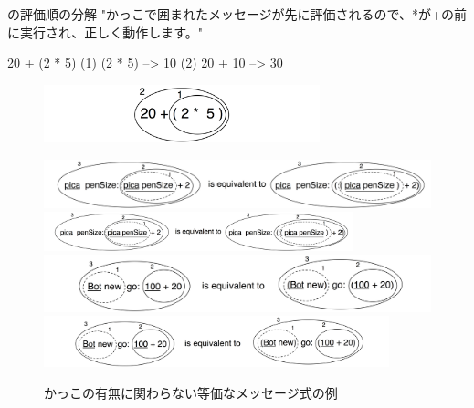 \documentclass[a4paper,10pt,twoside]{book}
\begin{document}
\begin{example}[mathcorrect]{の評価順の分解}{}
"かっこで囲まれたメッセージが先に評価されるので、*が+の前に実行され、正しく動作します。"

    20 + (2 * 5) 
(1)        (2 * 5) --> 10
(2) 20 + 10      --> 30
\end{example}

\begin{figure}
\begin{center}
\includegraphics[width=8cm]{ucompoNumberBracket}
\end{center}
\end{figure}



\begin{figure}
\begin{center}
\ifluluelse
	{\includegraphics[width=\textwidth]{uKeyUnBinPar}}
	{\includegraphics[width=0.8\textwidth]{uKeyUnBinPar}}
\ifluluelse
	{\includegraphics[width=\textwidth]{uunKeyBinPar}}
	{\includegraphics[width=10cm]{uunKeyBinPar}}
\end{center}
\caption{かっこの有無に関わらない等価なメッセージ式の例}
\end{figure}
\end{document}
